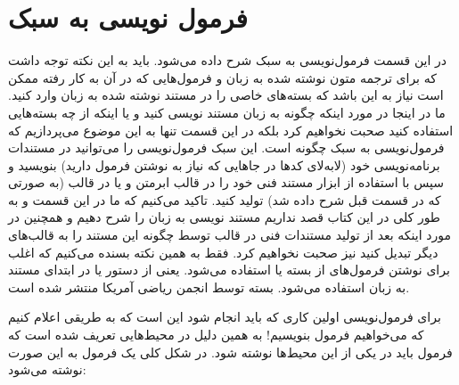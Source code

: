%
% 
% 
% 
%
\section{فرمول نویسی به سبک \lr{\LaTeX}}
\label{sec:latex-formula}
در این قسمت فرمول‌نویسی به سبک \lr{\LaTeX} شرح داده می‌شود. باید به این نکته
توجه داشت که برای ترجمه متون نوشته شده به زبان \lr{\LaTeX} و فرمول‌هایی که در آن
به کار رفته ممکن است نیاز به این باشد که بسته‌های خاصی را در مستند نوشته شده به
زبان \lr{\LaTeX} وارد کنید. ما در اینجا در مورد اینکه چگونه به زبان \lr{\LaTeX}
مستند نویسی کنید و یا اینکه از چه بسته‌هایی استفاده کنید صحبت نخواهیم کرد بلکه
در این قسمت تنها به این موضوع می‌پردازیم که فرمول‌نویسی به سبک \lr{\LaTeX} چگونه
است. این سبک فرمول‌نویسی را می‌توانید در مستندات برنامه‌نویسی خود (لابه‌لای
کدها در جاهایی که نیاز به نوشتن فرمول دارید) بنویسید و سپس با استفاده از ابزار
 مستند فنی خود را در قالب ابرمتن و یا در قالب \lr{\LaTeX} (به صورتی
که در قسمت قبل شرح داده شد) تولید کنید. تاکید می‌کنیم که ما در این قسمت و به طور
کلی در این کتاب قصد نداریم مستند نویسی به زبان \lr{\LaTeX} را شرح دهیم و همچنین
در مورد اینکه بعد از تولید مستندات فنی در قالب \lr{\LaTeX} توسط 
چگونه این مستند را به قالب‌های دیگر تبدیل کنید نیز صحبت نخواهیم کرد. فقط به همین
نکته بسنده می‌کنیم که اغلب برای نوشتن فرمول‌های \lr{\LaTeX} از بسته
  یا  استفاده می‌شود. یعنی از دستور  یا  در ابتدای مستند به زبان \lr{\LaTeX} استفاده می‌شود. بسته
 توسط انجمن ریاضی آمریکا منتشر شده است.

برای فرمول‌نویسی اولین کاری که باید انجام شود این است که به طریقی اعلام کنیم که
می‌خواهیم فرمول بنویسیم! به همین دلیل در \lr{\LaTeX} محیط‌هایی تعریف شده است که
فرمول باید در یکی از این محیط‌ها نوشته شود. در شکل کلی یک فرمول به این صورت
نوشته می‌شود:

